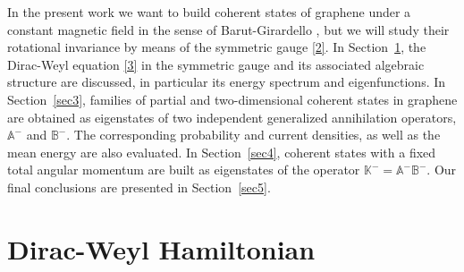 \documentclass[aps,showpacs,showkeys]{revtex4}
\begin{document}
In the present work we want to build coherent states of graphene under a constant magnetic field in the sense of Barut-Girardello \cite{bg71}, but we will study their rotational invariance by means of the symmetric gauge \eqref{2}.
In Section~\ref{sec2}, the Dirac-Weyl equation \eqref{3} in the symmetric gauge and its associated algebraic structure are discussed, in particular its energy spectrum and eigenfunctions. In Section~\ref{sec3}, families of partial and two-dimensional coherent states in graphene are obtained as eigenstates of two independent generalized annihilation operators, $\mathbb{A}^-$ and $\mathbb{B}^-$. The corresponding probability and current densities, as well as the mean energy are also evaluated. In Section~\ref{sec4}, coherent states with a fixed total angular momentum are built as eigenstates of the operator $\mathbb{K}^-=\mathbb{A}^-\mathbb{B}^-$. Our final conclusions are presented in Section~\ref{sec5}.




\section{Dirac-Weyl Hamiltonian}\label{sec2}
\end{document}
